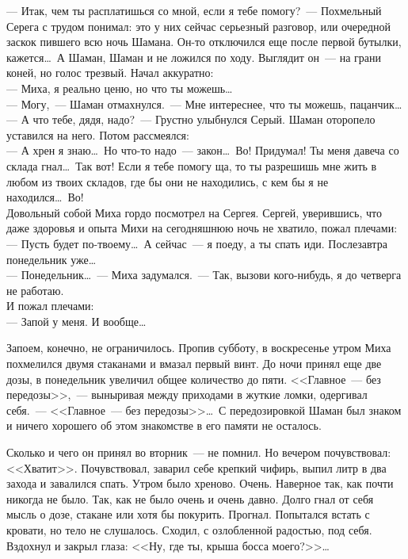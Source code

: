 \noindent --- Итак, чем ты расплатишься со мной, если я тебе помогу?~--- Похмельный Серега 
с трудом понимал: это у них сейчас серьезный разговор, или очередной заскок 
пившего всю ночь Шамана. Он-то отключился еще после первой бутылки, 
кажется\ldots\ А Шаман, Шаман и не ложился по ходу. Выглядит он~--- на грани коней, но голос 
трезвый. Начал аккуратно:\\
--- Миха, я реально ценю, но что ты можешь\ldots\\
--- Могу,~--- Шаман отмахнулся.~--- Мне интереснее, что ты можешь, пацанчик\ldots\\
--- А что тебе, дядя, надо?~--- Грустно улыбнулся Серый. Шаман оторопело 
уставился на него. Потом рассмеялся: \\
--- А хрен я знаю\ldots\ Но что-то надо~--- закон\ldots\ Во! Придумал! Ты меня 
давеча со 
склада гнал\ldots\ Так вот! Если я тебе помогу ща, то ты разрешишь мне жить в 
любом 
из твоих складов, где бы они не находились, с кем бы я не находился\ldots\ Во!\\
Довольный собой Миха гордо посмотрел на Сергея. Сергей, уверившись, что даже 
здоровья и опыта Михи на сегодняшнюю ночь не хватило, пожал плечами:\\
--- Пусть будет по-твоему\ldots\ А сейчас~--- я поеду, а ты спать иди. 
Послезавтра 
понедельник уже\ldots\\
--- Понедельник\ldots~--- Миха задумался.~--- Так, вызови кого-нибудь, я до 
четверга не работаю.\\
И пожал плечами:\\
--- Запой у меня. И вообще\ldots

Запоем, конечно, не ограничилось. Пропив субботу, в воскресенье утром Миха 
похмелился двумя стаканами и вмазал первый винт. До ночи принял еще две дозы, в 
понедельник увеличил общее количество до пяти. <<Главное~--- без 
передозы>>,~--- выныривая между приходами в жуткие ломки, одергивал себя.~--- <<Главное~--- без 
передозы>>\ldots\ С передозировкой Шаман был знаком и ничего хорошего об этом 
знакомстве в его памяти не осталось.

Сколько и чего он принял во вторник~--- не помнил. Но вечером почувствовал: 
<<Хватит>>. Почувствовал, заварил себе крепкий чифирь, выпил литр в два захода 
и завалился спать. Утром было хреново. Очень. Наверное так, как почти никогда не 
было. Так, как не было очень и очень давно. Долго гнал от себя мысль о дозе, 
стакане или хотя бы покурить. Прогнал. Попытался встать с кровати, но тело не 
слушалось. Сходил, с озлобленной радостью, под себя. Вздохнул и закрыл глаза: 
<<Ну, где ты, крыша босса моего?>>\ldots

